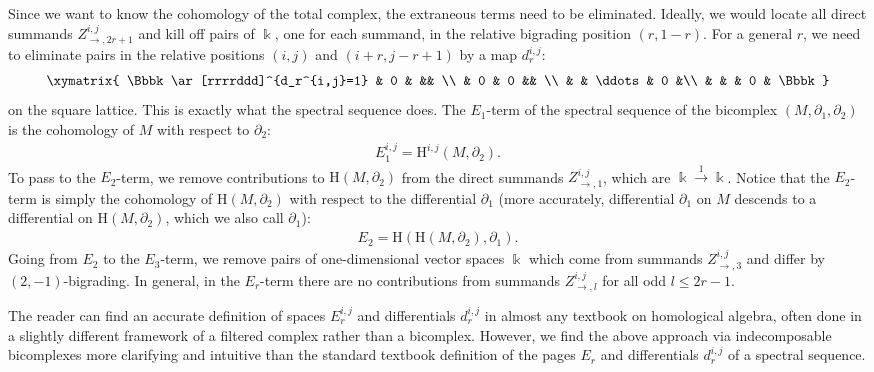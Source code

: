 \documentclass[10pt,a4paper]{amsart}
\theoremstyle{definition}
\numberwithin{equation}{section}
\def\dif{\partial}
\newcommand{\mH}{\mathrm{H}} %
\begin{document}
Since we want to know the cohomology of the total complex,
the extraneous terms need to be eliminated. Ideally, we would
locate all direct summands $Z^{i,j}_{\rightarrow,2r+1}$
and kill off pairs of $\Bbbk$, one for each summand, in the relative
bigrading position $(r,1-r)$. For a general $r$, we need to
eliminate pairs in the relative positions $(i,j)$ and $(i+r,j-r+1)$ by a map $d_r^{i,j}$:
\[
\begin{gathered}
\xymatrix{
 \Bbbk \ar[rrrrddd]^{d_r^{i,j}=1} & 0 & && \\
 & 0 & 0 && \\
 & & \ddots & 0 &\\
 & & & 0 & \Bbbk
}
\end{gathered}
\]
on the square lattice. This is exactly what the spectral sequence does.
The $E_1$-term of the spectral sequence of the bicomplex $(M,\dif_1,\dif_2)$
is the cohomology of $M$ with respect to $\dif_2$:
\begin{gather*}E_1^{i,j} = \mH^{i,j}(M,\dif_2).\end{gather*}
To pass to the $E_2$-term, we remove contributions to $\mH(M,\dif_2)$ from the
direct summands $Z^{i,j}_{\rightarrow, 1}$, which are
$\Bbbk\stackrel{1}{\rightarrow} \Bbbk$.
Notice that the $E_2$-term is simply the cohomology of $\mH(M,\dif_2)$ with
respect to the differential $\dif_1$ (more accurately, differential $\dif_1$ on $M$
descends to a differential on $\mH(M,\dif_2)$, which we also call $\dif_1$):
\begin{gather*} E_2 = \mH(\mH(M,\dif_2), \dif_1).\end{gather*}
Going from $E_2$ to the $E_3$-term, we remove pairs of one-dimensional vector
spaces $\Bbbk$
which come from summands $Z^{i,j}_{\rightarrow, 3}$ and differ by $(2,-1)$-bigrading.
In general, in the $E_r$-term there are no contributions from
summands $Z^{i,j}_{\rightarrow, l}$ for all odd $l\leq 2r-1$.

The reader can find an accurate definition of spaces $E_r^{i,j}$
and differentials $d_r^{i,j}$ in almost any textbook on homological algebra,
often done in a slightly different framework of a filtered complex rather than
a bicomplex. However, we find the above approach via indecomposable
bicomplexes more clarifying and intuitive than the standard textbook definition of the pages
$E_r$ and differentials $d_r^{i,j}$ of a spectral sequence.
\end{document}
